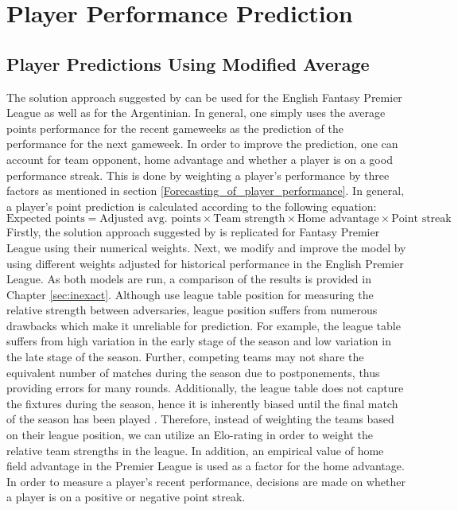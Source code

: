 \newpage



\section{Player Performance Prediction} \label{Player_Performance}



\subsection{Player Predictions Using Modified Average} \label{Sol_approach_Modified_Average}

The solution approach suggested by \cite{Bonomo} can be used for the English Fantasy Premier League as well as for the Argentinian. In general, one simply uses the average points performance for the recent gameweeks as the prediction of the performance for the next gameweek. In order to improve the prediction, one can account for team opponent, home advantage and whether a player is on a good performance streak. This is done by weighting a player's performance by three factors as mentioned in section \ref{Forecasting_of_player_performance}.
\newpar
In general, a player's point prediction is calculated according to the following equation:
\begin{equation}
    \textrm{Expected points} = \textrm{Adjusted avg. points} \times \textrm{Team strength} \times \textrm{Home advantage} \times \textrm{Point streak}
\end{equation}
\newpar
Firstly, the solution approach suggested by \cite{Bonomo} is replicated for Fantasy Premier League using their numerical weights. Next, we modify and improve the model by using different weights adjusted for historical performance in the English Premier League. As both models are run, a comparison of the results is provided in Chapter \ref{sec:inexact}. 
\newpar
Although \cite{Bonomo} use league table position for measuring the relative strength between adversaries, league position suffers from numerous drawbacks which make it unreliable for prediction. For example, the league table suffers from high variation in the early stage of the season and low variation in the late stage of the season. Further, competing teams may not share the equivalent number of matches during the season due to postponements, thus providing errors for many rounds. Additionally, the league table does not capture the fixtures during the season, hence it is inherently biased until the final match of the season has been played \citep{Constantinou}. Therefore, instead of weighting the teams based on their league position, we can utilize an Elo-rating in order to weight the relative team strengths in the league. In addition, an empirical value of home field advantage in the Premier League is used as a factor for the home advantage. In order to measure a player's recent performance, decisions are made on whether a player is on a positive or negative point streak.

